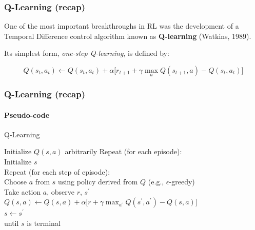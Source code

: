 \begin{frame}
	\frametitle{Q-Learning (recap)}
	
	\Large
	
	\vspace{0.8cm}
	
	One of the most important breakthroughs in RL was the development of a Temporal
	Difference control algorithm known as \textbf{Q-learning} (Watkins, 1989).
	
	\vspace{0.5cm}
	
	Its simplest form, \emph{one-step Q-learning}, is defined by:
	
	\vspace{-0.4cm}
	
	\begin{equation*}
		Q(s_t,a_t) \leftarrow Q(s_t,a_t) + \alpha \Big [ r_{t + 1} + \gamma \max_a Q(s_{t + 1},a) - Q(s_t,a_t) \Big ]
	\end{equation*}
\end{frame}

\begin{frame}
	\frametitle{Q-Learning (recap)}
	\framesubtitle{Pseudo-code}
	
	\begin{algorithm}[H]
		\caption{Q-Learning}
		\BlankLine
		Initialize $ Q(s,a) $ arbitrarily
		\BlankLine
		Repeat (for each episode):\\
		{
			\hspace{0.7cm}
			Initialize $ s $ \\
			\hspace{0.7cm}
			Repeat (for each step of episode): \\
			{
				\hspace{1.4cm}
				Choose $ a $ from $ s $ using policy derived from $ Q $
				(e.g., $ \epsilon $-greedy) \\
				\hspace{1.4cm}
				Take action $ a $, observe $ r $, $ s^\prime $ \\
				\hspace{1.4cm}
				$ Q(s,a) \leftarrow Q(s,a) + \alpha \Big [ r + \gamma \max_{a^\prime}
				  Q(s^\prime,a^\prime) - Q(s,a) \Big ] $ \\
				\hspace{1.4cm}
				$ s \leftarrow s^\prime $ \\
			}
			\hspace{0.7cm}
			until $ s $ is terminal
		}
	\end{algorithm}
\end{frame}

